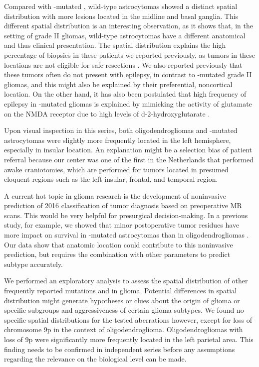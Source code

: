 Compared with -mutated ,  wild-type astrocytomas showed a distinct spatial distribution with more lesions located in the midline and basal ganglia.
This different spatial distribution is an interesting observation, as it shows that, in the setting of grade II gliomas,  wild-type astrocytomas have a different anatomical and thus clinical presentation.
The spatial distribution explains the high percentage of biopsies in these patients we reported previously, as \glspl{tumor} in these locations are not eligible for safe resections \autocite{wijnenga2017impact}.
We also reported previously \autocite{wijnenga2017impact} that these \glspl{tumor} often do not present with epilepsy, in contrast to -mutated grade II gliomas, and this might also be explained by their preferential, noncortical location.
On the other hand, it has also been postulated that high frequency of epilepsy in -mutated gliomas is explained by mimicking the activity of glutamate on the NMDA receptor due to high levels of d-2-hydroxyglutarate \autocite{chen2017mutant}.

Upon visual inspection in this series, both oligodendrogliomas and -mutated astrocytomas were slightly more frequently located in the left hemisphere, especially in insular location.
An explanation might be a selection bias of patient referral because our center was one of the first in the Netherlands that performed awake craniotomies, which are performed for \glspl{tumor} located in presumed eloquent regions such as the left insular, frontal, and temporal region.

A current hot topic in glioma research is the development of noninvasive prediction of  2016 classification of \gls{tumor} diagnosis based on preoperative MR scans.
This would be very helpful for presurgical decision-making.
In a previous study, for example, we showed that minor postoperative \gls{tumor} residues have more impact on survival in -mutated astrocytomas than in oligodendrogliomas \autocite{wijnenga2017impact}.
Our data show that anatomic location could contribute to this noninvasive prediction, but requires the combination with other parameters to predict  subtype accurately.

We performed an exploratory analysis to assess the spatial distribution of other frequently reported mutations and  in glioma.
Potential differences in spatial distribution might generate hypotheses or clues about the origin of glioma or specific subgroups and aggressiveness of certain glioma subtypes.
We found no specific spatial distributions for the tested aberrations however, except for loss of chromosome 9p in the context of oligodendroglioma.
Oligodendrogliomas with loss of 9p were significantly more frequently located in the left parietal area.
This finding needs to be confirmed in independent series before any assumptions regarding the relevance on the biological level can be made.

